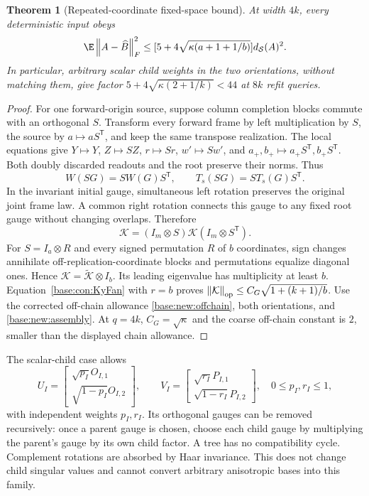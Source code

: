 \documentclass[11pt,oneside,openany,a4paper]{book}
\numberwithin{equation}{chapter}
\newtheorem{theorem}{Theorem}[chapter]
\theoremstyle{definition}
\theoremstyle{remark}
\newcommand{\T}{\mathsf T}\newcommand{\Id}{I}
\newcommand{\F}[1]{\left\lVert#1\right\rVert_F}
\newcommand{\op}[1]{\left\lVert#1\right\rVert_{\rm op}}
\begin{document}
\begin{theorem}[Repeated-coordinate fixed-space bound]\label{base:con:multiplicity-thm}
At width $4k$, every deterministic input obeys
\begin{equation}\label{base:con:multiplicity-error}
 \E\F{A-\widehat B}^2
 \le[5+4\sqrt{\kappa(a+1+1/b)}]d_{\mathcal S}(A)^2.
\end{equation}
In particular, arbitrary scalar child weights in the two orientations, without matching them, give factor $5+4\sqrt{\kappa(2+1/k)}<44$ at $8k$ refit queries.
\end{theorem}
\begin{proof}
For one forward-origin source, suppose column completion blocks commute with an orthogonal $S$. Transform every forward frame by left multiplication by $S$, the source by $a\mapsto aS^\T$, and keep the same transpose realization. The local equations give
$Y\mapsto Y$, $Z\mapsto SZ$, $r\mapsto Sr$, $w'\mapsto Sw'$, and
$a_+,b_+\mapsto a_+S^\T,b_+S^\T$. Both doubly discarded readouts and the root preserve their norms. Thus
\[
 W(SG)=SW(G)S^\T,\qquad T_s(SG)=ST_s(G)S^\T.
\]
In the invariant initial gauge, simultaneous left rotation preserves the original joint frame law. A common right rotation connects this gauge to any fixed root gauge without changing overlaps. Therefore
\[
 \mathcal K=(I_m\otimes S)\mathcal K(I_m\otimes S^\T).
\]
For $S=I_a\otimes R$ and every signed permutation $R$ of $b$ coordinates, sign changes annihilate off-replication-coordinate blocks and permutations equalize diagonal ones. Hence
$\mathcal K=\widetilde{\mathcal K}\otimes I_b$.
Its leading eigenvalue has multiplicity at least $b$. Equation~\eqref{base:con:KyFan} with $r=b$ proves
$\op{\mathcal K}\le C_G\sqrt{1+(k+1)/b}$.
Use the corrected off-chain allowance \eqref{base:new:offchain}, both orientations, and \eqref{base:new:assembly}. At $q=4k$, $C_G=\sqrt\kappa$ and the coarse off-chain constant is $2$, smaller than the displayed chain allowance.
\end{proof}

The scalar-child case allows
\[
 U_I=\begin{bmatrix}\sqrt{p_I}O_{I,1}\\\sqrt{1-p_I}O_{I,2}\end{bmatrix},\qquad
 V_I=\begin{bmatrix}\sqrt{r_I}P_{I,1}\\\sqrt{1-r_I}P_{I,2}\end{bmatrix},
 \quad 0\le p_I,r_I\le1,
\]
with independent weights $p_I,r_I$. Its orthogonal gauges can be removed recursively: once a parent gauge is chosen, choose each child gauge by multiplying the parent's gauge by its own child factor. A tree has no compatibility cycle. Complement rotations are absorbed by Haar invariance. This does not change child singular values and cannot convert arbitrary anisotropic bases into this family.
\end{document}
